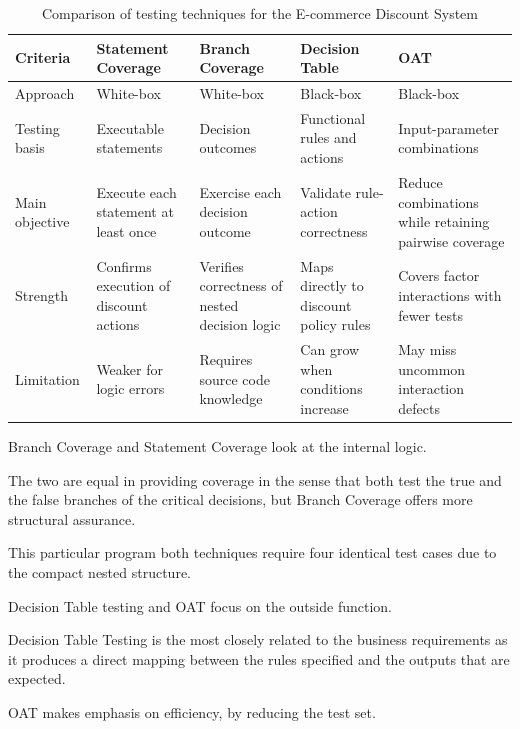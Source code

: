 \documentclass[conference]{IEEEtran}
\begin{document}
\begin{table}[!t]

\centering

\caption{Comparison of testing techniques for the E-commerce Discount System}

\label{tab:comparison}

\begin{tabular}{|L{2.2cm}|L{3cm}|L{3cm}|L{3cm}|L{3cm}|}
\hline
\textbf{Criteria} & \textbf{Statement Coverage} & \textbf{Branch Coverage} & \textbf{Decision Table} & \textbf{OAT} \\
\hline
Approach & White-box & White-box & Black-box & Black-box \\
\hline
Testing basis & Executable statements & Decision outcomes & Functional rules and actions & Input-parameter combinations \\
\hline
Main objective & Execute each statement at least once & Exercise each decision outcome & Validate rule-action correctness & Reduce combinations while retaining pairwise coverage \\
\hline
Strength & Confirms execution of discount actions & Verifies correctness of nested decision logic & Maps directly to discount policy rules & Covers factor interactions with fewer tests \\
\hline
Limitation & Weaker for logic errors & Requires source code knowledge & Can grow when conditions increase & May miss uncommon interaction defects \\
\hline
\end{tabular}

\end{table}



Branch Coverage and Statement Coverage look at the internal logic.

The two are equal in providing coverage in the sense that both test the true and the false branches of the critical decisions, but Branch Coverage offers more structural assurance.

This particular program both techniques require four identical test cases due to the compact nested structure.

Decision Table testing and OAT focus on the outside function.

Decision Table Testing is the most closely related to the business requirements as it produces a direct mapping between the rules specified and the outputs that are expected.

OAT makes emphasis on efficiency, by reducing the test set.
\end{document}
